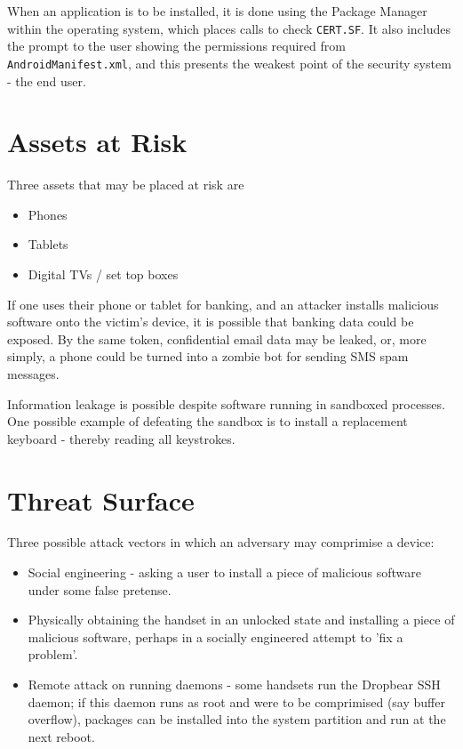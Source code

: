 \documentclass[a4paper]{article}
\begin{document}
\noindent When an application is to be installed, it is done using the Package
Manager within the operating system, which places calls to check \texttt{CERT.SF}. It
also includes the prompt to the user showing the permissions required from
\texttt{AndroidManifest.xml}, and this presents the weakest point of the
security system - the end user.

\section{Assets at Risk}
Three assets that may be placed at risk are
\begin{itemize}
  \item Phones
  \item Tablets
  \item Digital TVs / set top boxes
\end{itemize}

\noindent If one uses their phone or tablet for banking, and an attacker
installs malicious software onto the victim's device, it is possible that banking data
could be exposed. By the same token, confidential email data may be leaked, or,
more simply, a phone could be turned into a zombie bot for sending SMS
spam messages.

\noindent Information leakage is possible despite software running in sandboxed
processes. One possible example of defeating the sandbox is to install a
replacement keyboard - thereby reading all keystrokes.

\section{Threat Surface}
Three possible attack vectors in which an adversary may comprimise a device:
\begin{itemize}
  \item Social engineering - asking a user to install a piece of malicious
  software under some false pretense.
  \item Physically obtaining the handset in an unlocked state and installing a
  piece of malicious software, perhaps in a socially engineered attempt to 'fix
  a problem'.
  \item Remote attack on running daemons - some handsets run the Dropbear SSH
  daemon; if this daemon runs as root and were to be comprimised (say buffer
  overflow), packages can be installed into the system partition and run at the
  next reboot.
\end{itemize}
\end{document}
